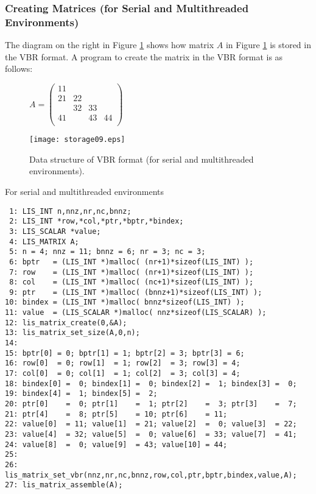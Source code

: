 \documentclass[a4paper]{article}
\begin{document}
\subsubsection{Creating Matrices (for Serial and Multithreaded Environments)}
The diagram on the right in Figure \ref{fig:storage09} shows how matrix $A$ in Figure \ref{fig:storage09} is stored in the VBR format. A program to create the matrix in the VBR format is as follows:
\begin{figure}[h]
{\centering 
\begin{minipage}{0.3\textwidth}
\begin{flushright}
$ 
A = \left(
\begin{array}{c|cc|c}
11 &    &    &    \\ \hline
21 & 22 &    &    \\
   & 32 & 33 &    \\ \hline
41 &    & 43 & 44 \\
\end{array}\right)
$
\end{flushright}
\end{minipage}
\begin{minipage}{0.6\textwidth}
\begin{flushleft}
\texttt{[image: storage09.eps]} 
\end{flushleft}
\end{minipage}
\caption{Data structure of VBR format (for serial and multithreaded environments).}\label{fig:storage09}}
\end{figure}
\begin{itemsquarebox}[l]{For serial and multithreaded environments}
\small
\begin{verbatim}
 1: LIS_INT n,nnz,nr,nc,bnnz;
 2: LIS_INT *row,*col,*ptr,*bptr,*bindex;
 3: LIS_SCALAR *value;
 4: LIS_MATRIX A;
 5: n = 4; nnz = 11; bnnz = 6; nr = 3; nc = 3;
 6: bptr   = (LIS_INT *)malloc( (nr+1)*sizeof(LIS_INT) );
 7: row    = (LIS_INT *)malloc( (nr+1)*sizeof(LIS_INT) );
 8: col    = (LIS_INT *)malloc( (nc+1)*sizeof(LIS_INT) );
 9: ptr    = (LIS_INT *)malloc( (bnnz+1)*sizeof(LIS_INT) );
10: bindex = (LIS_INT *)malloc( bnnz*sizeof(LIS_INT) );
11: value  = (LIS_SCALAR *)malloc( nnz*sizeof(LIS_SCALAR) );
12: lis_matrix_create(0,&A);
13: lis_matrix_set_size(A,0,n);
14:
15: bptr[0] = 0; bptr[1] = 1; bptr[2] = 3; bptr[3] = 6;
16: row[0]  = 0; row[1]  = 1; row[2]  = 3; row[3] = 4;
17: col[0]  = 0; col[1]  = 1; col[2]  = 3; col[3] = 4;
18: bindex[0] =  0; bindex[1] =  0; bindex[2] =  1; bindex[3] =  0;
19: bindex[4] =  1; bindex[5] =  2;
20: ptr[0]    =  0; ptr[1]    =  1; ptr[2]    =  3; ptr[3]    =  7;
21: ptr[4]    =  8; ptr[5]    = 10; ptr[6]    = 11;
22: value[0]  = 11; value[1]  = 21; value[2]  =  0; value[3]  = 22;
23: value[4]  = 32; value[5]  =  0; value[6]  = 33; value[7]  = 41;
24: value[8]  =  0; value[9]  = 43; value[10] = 44;
25:
26: lis_matrix_set_vbr(nnz,nr,nc,bnnz,row,col,ptr,bptr,bindex,value,A);
27: lis_matrix_assemble(A);
\end{verbatim}
\end{itemsquarebox}
\end{document}
